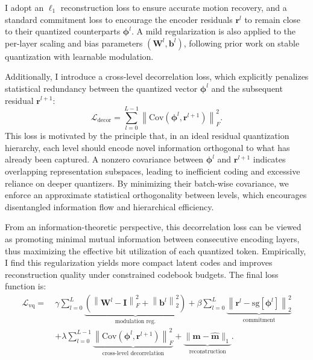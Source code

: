 \documentclass[a4paper,12pt]{article}
\begin{document}
I adopt an $\ell_1$ reconstruction loss to ensure accurate motion recovery, and a standard commitment loss to encourage the encoder residuals $\mathbf{r}^l$ to remain close to their quantized counterparts $\boldsymbol{\phi}^l$. A mild regularization is also applied to the per-layer scaling and bias parameters $(\mathbf{W}^l, \mathbf{b}^l)$, following prior work on stable quantization with learnable modulation.

Additionally, I introduce a cross-level decorrelation loss, which explicitly penalizes statistical redundancy between the quantized vector $\boldsymbol{\phi}^l$ and the subsequent residual $\mathbf{r}^{l+1}$:
\begin{equation}
\label{eq:decoLa}
\mathcal{L}_{\text{decor}} = \sum_{l=0}^{L-1} \left\| \mathrm{Cov}\left(\boldsymbol{\phi}^l, \mathbf{r}^{l+1} \right) \right\|_F^2.
\end{equation}
This loss is motivated by the principle that, in an ideal residual quantization hierarchy, each level should encode novel information orthogonal to what has already been captured. A nonzero covariance between $\boldsymbol{\phi}^l$ and $\mathbf{r}^{l+1}$ indicates overlapping representation subspaces, leading to inefficient coding and excessive reliance on deeper quantizers. By minimizing their batch-wise covariance, we enforce an approximate statistical orthogonality between levels, which encourages disentangled information flow and hierarchical efficiency.

From an information-theoretic perspective, this decorrelation loss can be viewed as promoting minimal mutual information between consecutive encoding layers, thus maximizing the effective bit utilization of each quantized token. Empirically, I find this regularization yields more compact latent codes and improves reconstruction quality under constrained codebook budgets. The final loss function is:
\begin{align}
\mathcal{L}_{\mathrm{vq}} =\ 
& \gamma \sum_{l=0}^{L} \underbrace{\left( \left\| \mathbf{W}^l \!-\! \mathbf{I} \right\|_F^2 \!+\! \left\| \mathbf{b}^l \right\|_2^2 \right)}_{\text{modulation reg.}} \!+\!
\beta \sum_{l=0}^{L} \underbrace{\left\| \mathbf{r}^l \!-\! \mathrm{sg}[\boldsymbol{\phi}^l] \right\|_2^2}_{\text{commitment}} \nonumber \\
& + \lambda \sum_{l=0}^{L-1} \underbrace{\left\| \mathrm{Cov}\left(\boldsymbol{\phi}^l, \mathbf{r}^{l+1} \right) \right\|_F^2}_{\text{cross-level decorrelation}} +
\underbrace{\| \mathbf{m} - \hat{\mathbf{m}} \|_1}_{\text{reconstruction}}.
\end{align}
\end{document}
